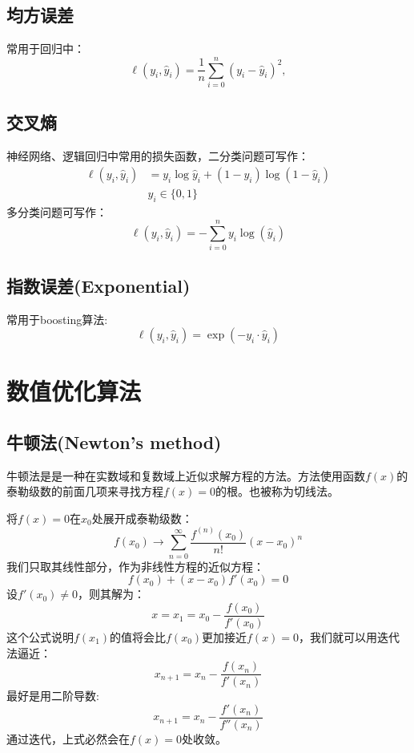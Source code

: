 \documentclass[11pt]{report}
\begin{document}
\subsection{均方误差}
常用于回归中：
\begin{equation}
	\ell(y_i,\hat{y}_i)=\frac{1}{n}\sum_{i=0}^n(y_i-\hat{y}_i)^2,
\end{equation}
\subsection{交叉熵}
神经网络、逻辑回归中常用的损失函数，二分类问题可写作：
\begin{equation}
	\begin{split}
		\ell(y_i,\hat{y}_i)&=y_i\log\hat{y}_i+(1-y_i)\log(1-\hat{y}_i)\\
		&y_i\in\{0,1\}
	\end{split}
\end{equation}
多分类问题可写作：
\begin{equation}
	\ell(y_i,\hat{y}_i)=-\sum_{i=0}^ny_i\log(\hat{y}_i)
\end{equation}
\subsection{指数误差(Exponential)}
常用于boosting算法:
\begin{equation}
	\ell(y_i,\hat{y}_i)=\exp(-y_i\cdot\hat{y}_i)
\end{equation}

\section{数值优化算法}
\subsection{牛顿法(Newton's method)}
牛顿法是是一种在实数域和复数域上近似求解方程的方法。方法使用函数$f(x)$的泰勒级数的前面几项来寻找方程$f(x)=0$的根。也被称为切线法。
\par
将$f(x)=0$在$x_0$处展开成泰勒级数：
\begin{equation}
	f(x_0)\rightarrow\sum_{n=0}^\infty\frac{f^{(n)}(x_0)}{n!}(x-x_0)^n
\end{equation}
我们只取其线性部分，作为非线性方程的近似方程：
\begin{equation}
	f(x_0)+(x-x_0)f'(x_0)=0
\end{equation}
设$f'(x_0)\neq0$，则其解为：
\begin{equation}
	x=x_1=x_0-\frac{f(x_0)}{f'(x_0)}
\end{equation}
这个公式说明$f(x_1)$的值将会比$f(x_0)$更加接近$f(x)=0$，我们就可以用迭代法逼近：
\begin{equation}
	x_{n+1}=x_n-\frac{f(x_n)}{f'(x_n)}
\end{equation}
最好是用二阶导数:
\begin{equation}
	x_{n+1}=x_n-\frac{f'(x_n)}{f''(x_n)}
\end{equation}
通过迭代，上式必然会在$f(x)=0$处收敛。
\end{document}
